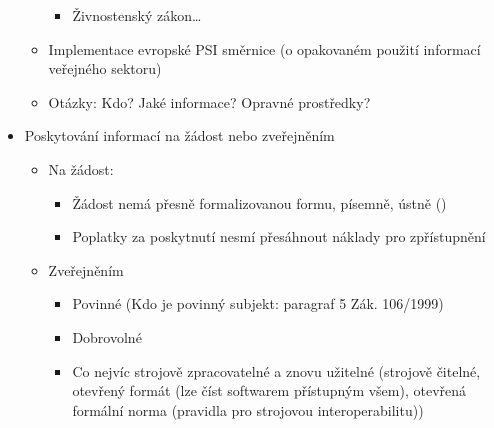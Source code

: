 \begin{itemize}
\begin{itemize}
\begin{itemize}
        \item Živnostenský zákon…
    \end{itemize}
    \item Implementace evropské PSI směrnice (o opakovaném použití informací veřejného
sektoru)
    \item Otázky: Kdo? Jaké informace? Opravné prostředky?
\end{itemize}
    \item Poskytování informací na žádost nebo zveřejněním
    \begin{itemize}
        \item  Na žádost:
        \begin{itemize}
            \item Žádost nemá přesně formalizovanou formu, písemně, ústně ()
            \item Poplatky za poskytnutí nesmí přesáhnout náklady pro zpřístupnění
        \end{itemize}
        \item Zveřejněním
        \begin{itemize}
            \item Povinné (Kdo je povinný subjekt: paragraf 5 Zák. 106/1999)
            \item Dobrovolné
            \item Co nejvíc strojově zpracovatelné a znovu užitelné (strojově čitelné, otevřený
formát (lze číst softwarem přístupným všem), otevřená formální norma
(pravidla pro strojovou interoperabilitu))
        \end{itemize}
    \end{itemize}
\end{itemize}

